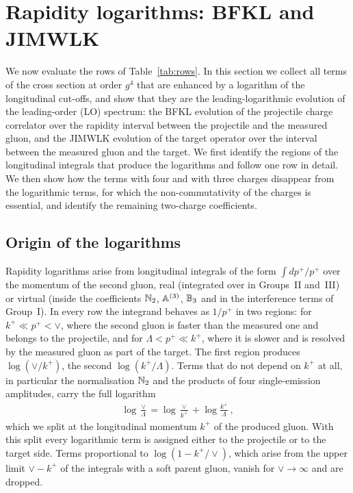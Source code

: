 \section{Rapidity logarithms: BFKL and JIMWLK}\label{sec:rapidity}

We now evaluate the rows of Table~\ref{tab:rows}. In this section we collect all terms of the cross section at order $g^4$ that are enhanced by a logarithm of the longitudinal cut-offs, and show that they are the leading-logarithmic evolution of the leading-order (LO) spectrum: the BFKL evolution of the projectile charge correlator over the rapidity interval between the projectile and the measured gluon, and the JIMWLK evolution of the target operator over the interval between the measured gluon and the target. We first identify the regions of the longitudinal integrals that produce the logarithms and follow one row in detail. We then show how the terms with four and with three charges disappear from the logarithmic terms, for which the non-commutativity of the charges is essential, and identify the remaining two-charge coefficients.

\subsection{Origin of the logarithms}\label{sec:loglong}

Rapidity logarithms arise from longitudinal integrals of the form $\int dp^+/p^+$ over the momentum of the second gluon, real (integrated over in Groups~II and~III) or virtual (inside the coefficients $\mathbb{N}_2$, $\mathbb{A}^{(3)}$, $\mathbb{B}_3$ and in the interference terms of Group~I). In every row the integrand behaves as $1/p^+$ in two regions: for $k^+\ll p^+<\vee$, where the second gluon is faster than the measured one and belongs to the projectile, and for $\Lambda<p^+\ll k^+$, where it is slower and is resolved by the measured gluon as part of the target. The first region produces $\log(\vee/k^+)$, the second $\log(k^+/\Lambda)$. Terms that do not depend on $k^+$ at all, in particular the normalisation $\mathbb{N}_2$ and the products of four single-emission amplitudes, carry the full logarithm
\begin{align}\label{eq:logsplit}
\log\frac{\vee}{\Lambda}=\log\frac{\vee}{k^+}+\log\frac{k^+}{\Lambda}\,,
\end{align}
which we split at the longitudinal momentum $k^+$ of the produced gluon. With this split every logarithmic term is assigned either to the projectile or to the target side. Terms proportional to $\log(1-k^+/\vee)$, which arise from the upper limit $\vee-k^+$ of the integrals with a soft parent gluon, vanish for $\vee\to\infty$ and are dropped.

